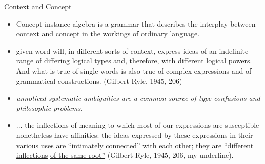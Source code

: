 \begin{frame}{Context and Concept}
\begin{itemize}
	\item Concept-instance algebra is a grammar that describes the interplay between context and concept in the workings of ordinary language.
\pause	\item
\begin{tightquote}
[a] given word will, in different sorts of context, express ideas of an indefinite range of differing logical types and, therefore, with different logical powers. And what is true of single words is also true of complex expressions and of grammatical constructions. (Gilbert Ryle, 1945, 206)
\end{tightquote}
\medskip
\pause
\item \textit{unnoticed systematic ambiguities are a common source of type-confusions and philosophic problems}.
\end{itemize}
\end{frame}
\begin{frame}
\begin{itemize}
\item 
\begin{tightquote}
... the inflections of meaning to which most of our expressions are susceptible nonetheless have affinities: the ideas expressed by these expressions in their various uses are “intimately connected” with each other; 
they are \underline{“different inflections} \underline{of the same root”} (Gilbert Ryle, 1945, 206, my underline).
\end{tightquote}

\end{itemize}
\end{frame}


